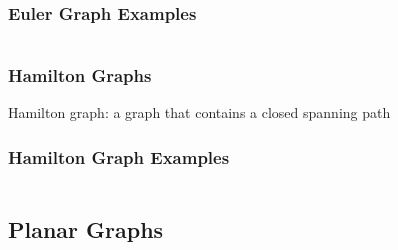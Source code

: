 \documentclass[dvipsnames]{beamer}
\begin{document}
\begin{frame}
  \frametitle{Euler Graph Examples}

  \begin{columns}
    \begin{example}
      \begin{center}
      \end{center}
    \end{example}

    \begin{example}
      \begin{center}
      \end{center}
    \end{example}
  \end{columns}
\end{frame}

\begin{frame}
  \frametitle{Hamilton Graphs}

  \begin{definition}
    \alert{Hamilton graph}: a graph that contains a closed spanning path
  \end{definition}
\end{frame}

\begin{frame}
  \frametitle{Hamilton Graph Examples}

  \begin{columns}
    \begin{example}
      \begin{center}
      \end{center}
    \end{example}

    \begin{example}
      \begin{center}
      \end{center}
    \end{example}
  \end{columns}
\end{frame}

\subsection{Planar Graphs}
\end{document}
